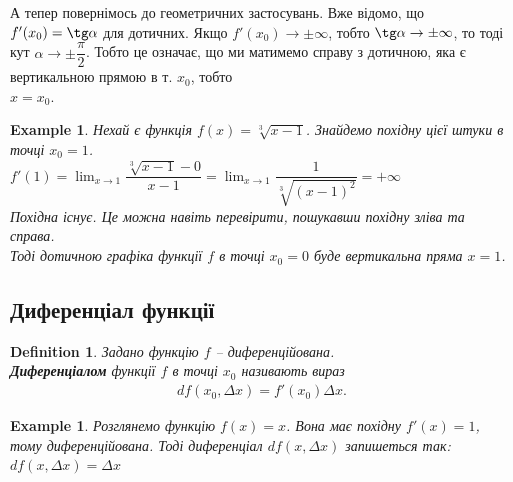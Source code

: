 \documentclass[a4paper, 14pt]{article}
\theoremstyle{theoremdd}
\theoremstyle{theoremdd}
\newtheorem{definition}[theorem]{Definition}
\theoremstyle{theoremdd}
\theoremstyle{theoremdd}
\newtheorem{example}[theorem]{Example}
\theoremstyle{theoremdd}
\theoremstyle{theoremdd}
\theoremstyle{theoremdd}
\theoremstyle{theoremdd}
\begin{document}
А тепер повернімось до геометричних застосувань. Вже відомо, що $f'(x_0) = \tg \alpha$ для дотичних. Якщо $f'(x_0) \to \pm \infty$, тобто $\tg \alpha \to \pm \infty$, то тоді кут $\alpha \to \pm \dfrac{\pi}{2}$. Тобто це означає, що ми матимемо справу з дотичною, яка є вертикальною прямою в т. $x_0$, тобто\\
$x=x_0$.

\begin{example}
Нехай є функція $f(x) = \sqrt[3]{x-1}$. Знайдемо похідну цієї штуки в точці $x_0 = 1$.\\
$f'(1) = \displaystyle \lim_{x \to 1} \dfrac{\sqrt[3]{x-1}-0}{x-1} = \lim_{x \to 1} \dfrac{1}{\sqrt[3]{(x-1)^2}} = + \infty$\\
Похідна існує. Це можна навіть перевірити, пошукавши похідну зліва та справа.\\
Тоді дотичною графіка функції $f$ в точці $x_0 = 0$ буде вертикальна пряма $x = 1$.
\\ %
\end{example}

\subsection{Диференціал функції}
\begin{definition}
Задано функцію $f$ -- диференційована.\\
\textbf{Диференціалом} функції $f$ в точці $x_0$ називають вираз
\begin{align*}
df(x_0,\Delta x) = f'(x_0) \Delta x.
\end{align*}
\end{definition}

\begin{example}
Розглянемо функцію $f(x) = x$. Вона має похідну $f'(x) = 1$, тому диференційована. Тоді диференціал $df(x,\Delta x)$ запишеться так: $df(x,\Delta x) = \Delta x$
\end{example}
\end{document}
